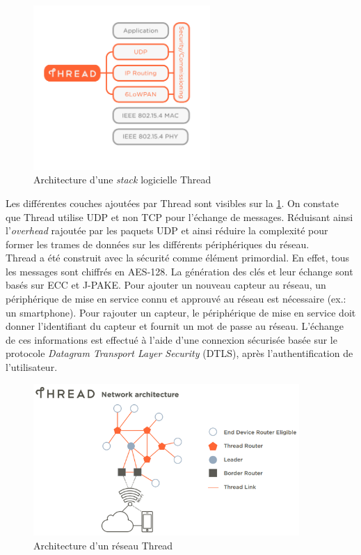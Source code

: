 \begin{figure}[ht!]
    \centering
    \includegraphics[width=0.6\textwidth]{Figures/StateOfTheArt/thread_stack.png}
    \caption{Architecture d'une \textit{stack} logicielle Thread}
    \label{fig-thread_stack}
\end{figure}

Les différentes couches ajoutées par Thread sont visibles sur la \cref{fig-thread_stack}. On constate que Thread utilise UDP et non TCP pour l'échange de messages. Réduisant ainsi l'\textit{overhead} rajoutée par les paquets UDP et ainsi réduire la complexité pour former les trames de données sur les différents périphériques du réseau. \\

Thread a été construit avec la sécurité comme élément primordial. En effet, tous les messages sont chiffrés en AES-128. La génération des clés et leur échange sont basés sur ECC et J-PAKE\cite{Sevenkey87:online}. Pour ajouter un nouveau capteur au réseau, un périphérique de mise en service connu et approuvé au réseau est nécessaire (ex.: un smartphone). Pour rajouter un capteur, le périphérique de mise en service doit donner l'identifiant du capteur et fournit un mot de passe au réseau. L'échange de ces informations est effectué à l'aide d'une connexion sécurisée basée sur le protocole \textit{Datagram Transport Layer Security} (DTLS), après l'authentification de l'utilisateur.


\begin{figure}[ht!]
    \centering
    \includegraphics[width=0.9\textwidth]{Figures/StateOfTheArt/thread_architecture.png}
    \caption{Architecture d'un réseau Thread}
    \label{fig-thread_architecture}
\end{figure}

